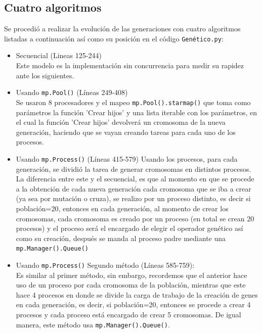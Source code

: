 \documentclass[a4paper,twocolumn,10pt]{article}
\begin{document}
\subsection{Cuatro algoritmos}
Se procedió a realizar la evolución de las generaciones con cuatro algoritmos listadas a continuación así como su posición en el código \verb|Genético.py|:
\begin{itemize}
    \item Secuencial (Lineas 125-244)\\
    Este modelo es la implementación sin concurrencia para medir su rapidez ante los siguientes.
    \item Usando \verb|mp.Pool()| (Líneas 249-408)\\
     Se usaron 8 procesadores y el mapeo \verb|mp.Pool().starmap()| que toma como parámetros la función 'Crear hijos' y una lista iterable con los parámetros, en el cual la función 'Crear hijos' devolverá un cromosoma de la nueva generación, haciendo que se vayan creando tareas para cada uno de los procesos.\\
    \item Usando \verb|mp.Process()| (Líneas 415-579)
    Usando los procesos, para cada generación, se dividió la tarea de generar cromosomas en distintos procesos. La diferencia entre este y el secuencial, es que al momento en que se procede a la obtención de cada nueva generación cada cromosoma que se iba a crear (ya sea por mutación o cruza), se realizo por un proceso distinto, es decir si población=20, entonces en cada generación, al momento de crear los cromosomas, cada cromosoma es creado por un proceso (en total se crean 20 procesos) y el proceso será el encargado de elegir el operador genético así como su creación, después se manda al proceso padre mediante una \verb|mp.Manager().Queue()|
    \item Usando \verb|mp.Process()| Segundo método (Líneas 585-759):\\
    Es similar al primer método, sin embargo, recordemos que el anterior hace uso de un proceso por cada cromosoma de la población, mientras que este hace 4 procesos en donde se divide la carga de trabajo de la creación de genes en cada generación, es decir, si población=20, entonces se procede a crear 4 procesos y cada proceso está encargado de crear 5 cromosomas. De igual manera, este método usa \verb|mp.Manager().Queue()|.\\
    
   
\end{itemize}
\end{document}
